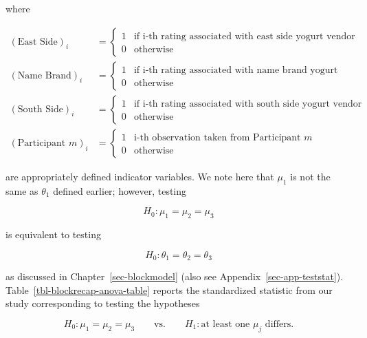 \documentclass[
  letterpaper,
  DIV=11,
  numbers=noendperiod]{scrreprt}
\theoremstyle{plain}
\theoremstyle{definition}
\theoremstyle{definition}
\theoremstyle{remark}
\begin{document}
where

\[
\begin{aligned}
  (\text{East Side})_i &= \begin{cases}
    1 & \text{if i-th rating associated with east side yogurt vendor} \\
    0 & \text{otherwise}
    \end{cases} \\
  (\text{Name Brand})_i &= \begin{cases}
    1 & \text{if i-th rating associated with name brand yogurt vendor} \\
    0 & \text{otherwise}
    \end{cases} \\
  (\text{South Side})_i &= \begin{cases}
    1 & \text{if i-th rating associated with south side yogurt vendor} \\
    0 & \text{otherwise}
    \end{cases} \\
  (\text{Participant } m)_i &= \begin{cases}
    1 & \text{i-th observation taken from Participant } m \\
    0 & \text{otherwise}
    \end{cases}
\end{aligned}
\]

are appropriately defined indicator variables. We note here that
\(\mu_1\) is not the same as \(\theta_1\) defined earlier; however,
testing

\[H_0: \mu_1 = \mu_2 = \mu_3\]

is equivalent to testing

\[H_0: \theta_1 = \theta_2 = \theta_3\]

as discussed in Chapter~\ref{sec-blockmodel} (also see
Appendix~\ref{sec-app-teststat}). Table~\ref{tbl-blockrecap-anova-table}
reports the standardized statistic from our study corresponding to
testing the hypotheses

\[H_0: \mu_1 = \mu_2 = \mu_3 \qquad \text{vs.} \qquad H_1: \text{at least one } \mu_j \text{ differs.}\]

\begin{table}

\caption{\label{tbl-blockrecap-anova-table}ANOVA table summarizing the
comparison of the appearance ratings of frozen yogurt across three
vendors from the Frozen Yogurt Case Study.}


\end{table}%
\end{document}
